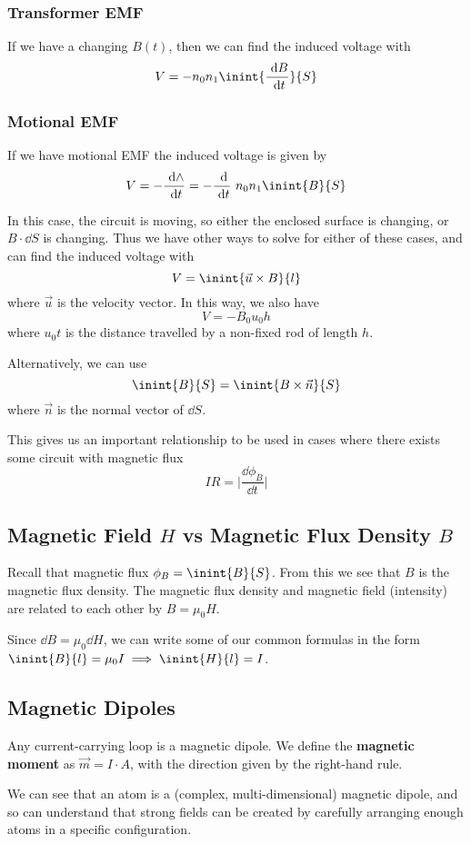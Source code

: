 \documentclass[12pt]{article}
\begin{document}
\subsubsection*{Transformer EMF}
If we have a changing $B(t)$, then we can find the induced voltage with \[ V = -n_0n_1 \inint{\frac{\dd B}{\dd t}}{S} \]

\subsubsection*{Motional EMF}
If we have motional EMF the induced voltage is given by \[ V = - \frac{\dd \land}{\dd t} = - \frac{\dd}{\dd t}\ n_0n_1 \inint{B}{S} \]

In this case, the circuit is moving, so either the enclosed surface is changing, or $B \cdot \dd S$ is changing. Thus we have other ways to solve for either of these cases, and can find the induced voltage with \[ V = \inint{\vec{u} \times B}{l} \] where $\vec{u}$ is the velocity vector. In this way, we also have \[ V = - B_0 u_0 h \] where $u_0 t$ is the distance travelled by a non-fixed rod of length $h$.

Alternatively, we can use \[ \inint{B}{S} = \inint{B \times \vec{n}}{S} \] where $\vec{n}$ is the normal vector of $\dd S$.

This gives us an important relationship to be used in cases where there exists some circuit with magnetic flux \[ IR = \bigg|\frac{\dd \phi_B}{\dd t}\bigg| \]

\subsection*{Magnetic Field $H$ vs Magnetic Flux Density $B$}
Recall that magnetic flux $\phi_B = \inint{B}{S}$. From this we see that $B$ is the magnetic flux density. The magnetic flux density and magnetic field (intensity) are related to each other by $B = \mu_0 H$.

Since $\dd B = \mu_0 \dd H$, we can write some of our common formulas in the form $\inint{B}{l} = \mu_0 I \implies \inint{H}{l} = I$.

\subsection*{Magnetic Dipoles}
Any current-carrying loop is a magnetic dipole. We define the {\bf magnetic moment} as $\vec{m} = I \cdot A$, with the direction given by the right-hand rule.

We can see that an atom is a (complex, multi-dimensional) magnetic dipole, and so can understand that strong fields can be created by carefully arranging enough atoms in a specific configuration.
\end{document}

